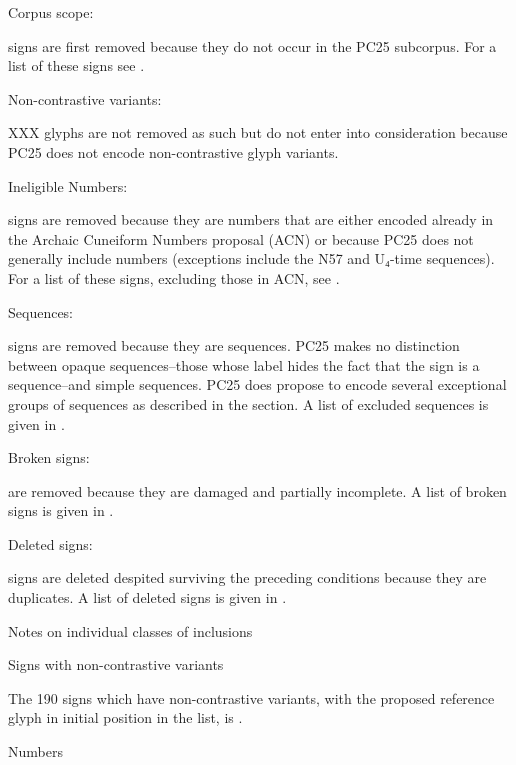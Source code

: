 \Hol\Hli{}\bgroup\remfor{}Corpus scope:\egroup{} 
	
	signs are first removed because they do not occur in the PC25
	subcorpus.  For a list of these signs see .

\Hli{}\bgroup\remfor{}Non-contrastive variants:\egroup{}

	XXX glyphs are not removed as such but do not enter into
	consideration because PC25 does not encode non-contrastive
	glyph variants.

\Hli{}\bgroup\remfor{}Ineligible Numbers:\egroup{} 
	
	signs are removed because they are numbers that are either
	encoded already in the Archaic Cuneiform Numbers proposal
	(ACN) or because PC25 does not generally include numbers
	(exceptions include the N57 and U₄-time sequences). For a list
	of these signs, excluding those in ACN, see .

\Hli{}\bgroup\remfor{}Sequences:\egroup{} 
	
	signs are removed because they are sequences. PC25 makes no
	distinction between opaque sequences--those whose label hides
	the fact that the sign is a sequence--and simple sequences.
	PC25 does propose to encode several exceptional groups of
	sequences as described in the  section.  A
	list of excluded sequences is given in .

\Hli{}\bgroup\remfor{}Broken signs:\egroup{} 
	
	are removed because they are damaged and partially incomplete.
	A list of broken signs is given in .

\Hli{}\bgroup\remfor{}Deleted signs:\egroup{} 
	
	signs are deleted despited surviving the preceding conditions
	because they are duplicates.  A list of deleted signs is given
	in .

\Hendol
\Hhh{}Notes on individual classes of inclusions

\Hhhh{}Signs with non-contrastive variants


\par The 190 signs which have non-contrastive variants, with the
      proposed reference glyph in initial position in the list, is
      .

\Hhhh{}Numbers


